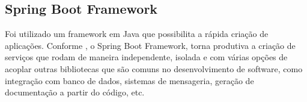 \subsection{Spring Boot Framework}

Foi utilizado um framework em Java que possibilita a rápida criação de aplicações.
Conforme \cite[8]{spring-boot-reference-guide}, o Spring Boot Framework, torna
produtiva a criação de serviços que rodam de maneira independente, isolada
e com várias opções de acoplar outras bibliotecas que são comuns no desenvolvimento
de software, como integração com banco de dados, sistemas de mensageria, geração
de documentação a partir do código, etc.

